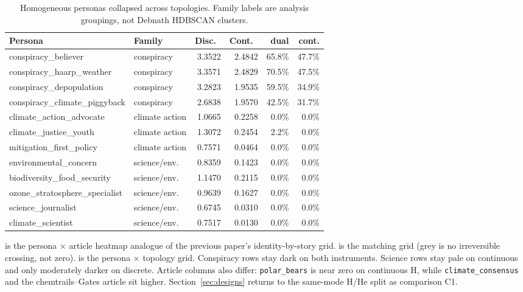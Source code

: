 \begin{table}[t]
\centering
\caption{Homogeneous personas collapsed across topologies.
Family labels are analysis groupings, not Debnath HDBSCAN clusters.}
\label{tab:persona}
\scriptsize
\begin{tabular}{llrrrr}
\toprule
Persona & Family & Disc.\ \MPR{} & Cont.\ \MPR{} & \kstar{} dual & \kstar{} cont. \\
\midrule
conspiracy\_believer & conspiracy & 3.3522 & 2.4842 & 65.8\% & 47.7\% \\
conspiracy\_haarp\_weather & conspiracy & 3.3571 & 2.4829 & 70.5\% & 47.5\% \\
conspiracy\_depopulation & conspiracy & 3.2823 & 1.9535 & 59.5\% & 34.9\% \\
conspiracy\_climate\_piggyback & conspiracy & 2.6838 & 1.9570 & 42.5\% & 31.7\% \\
climate\_action\_advocate & climate action & 1.0665 & 0.2258 & 0.0\% & 0.0\% \\
climate\_justice\_youth & climate action & 1.3072 & 0.2454 & 2.2\% & 0.0\% \\
mitigation\_first\_policy & climate action & 0.7571 & 0.0464 & 0.0\% & 0.0\% \\
environmental\_concern & science/env. & 0.8359 & 0.1423 & 0.0\% & 0.0\% \\
biodiversity\_food\_security & science/env. & 1.1470 & 0.2115 & 0.0\% & 0.0\% \\
ozone\_stratosphere\_specialist & science/env. & 0.9639 & 0.1627 & 0.0\% & 0.0\% \\
science\_journalist & science/env. & 0.6745 & 0.0310 & 0.0\% & 0.0\% \\
climate\_scientist & science/env. & 0.7517 & 0.0130 & 0.0\% & 0.0\% \\
\bottomrule
\end{tabular}
\end{table}

 is the persona $\times$ article heatmap analogue of the previous paper's identity-by-story grid.
 is the matching \kstar{} grid (grey is no irreversible crossing, not zero).
 is the persona $\times$ topology grid.
Conspiracy rows stay dark on both instruments.
Science rows stay pale on continuous and only moderately darker on discrete.
Article columns also differ: \texttt{polar\_bears} is near zero on continuous H, while \texttt{climate\_consensus} and the chemtrails--Gates article sit higher.
Section~\ref{sec:designs} returns to the same-mode H/He split as comparison C1.

